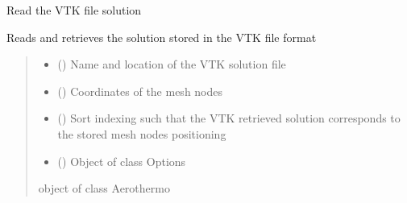 \documentclass[letterpaper,10pt,english]{sphinxmanual}
\begin{document}

\begin{fulllineitems}
\label{\detokenize{modules:su2.read_vtk_from_su2_v2}}
\pysigstartsignatures
{}
\pysigstopsignatures
\sphinxAtStartPar
Read the VTK file solution

\sphinxAtStartPar
Reads and retrieves the solution stored in the VTK file format
\begin{quote}\begin{description}
\begin{itemize}
\item {} 
\sphinxAtStartPar
{} () \textendash{} Name and location of the VTK solution file

\item {} 
\sphinxAtStartPar
{} (\sphinxstyleliteralemphasis{\sphinxupquote{(}}\sphinxstyleliteralemphasis{\sphinxupquote{)}}) \textendash{} Coordinates of the mesh nodes

\item {} 
\sphinxAtStartPar
{} () \textendash{} Sort indexing such that the VTK retrieved solution corresponds to the stored mesh nodes positioning

\item {} 
\sphinxAtStartPar
{} ({\hyperref[\detokenize{modules:configuration.Options}]{}}) \textendash{} Object of class Options

\end{itemize}

\sphinxAtStartPar
{} \textendash{} object of class Aerothermo

\sphinxAtStartPar
{\hyperref[\detokenize{modules:configuration.Aerothermo}]{}}

\end{description}\end{quote}

\end{fulllineitems}
\end{document}
